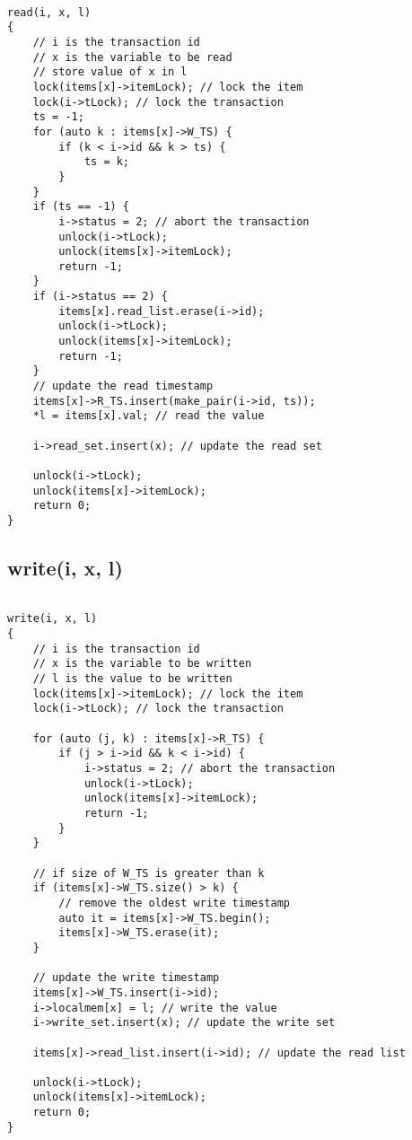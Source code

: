 \documentclass[12pt]{article}
\begin{document}
\begin{lstlisting}

read(i, x, l)
{
    // i is the transaction id
    // x is the variable to be read
    // store value of x in l
    lock(items[x]->itemLock); // lock the item
    lock(i->tLock); // lock the transaction
    ts = -1;
    for (auto k : items[x]->W_TS) {
        if (k < i->id && k > ts) {
            ts = k;
        }
    }
    if (ts == -1) {
        i->status = 2; // abort the transaction
        unlock(i->tLock);
        unlock(items[x]->itemLock);
        return -1;
    }
    if (i->status == 2) {
        items[x].read_list.erase(i->id);
        unlock(i->tLock);
        unlock(items[x]->itemLock);
        return -1;
    }
    // update the read timestamp
    items[x]->R_TS.insert(make_pair(i->id, ts));
    *l = items[x].val; // read the value
    
    i->read_set.insert(x); // update the read set

    unlock(i->tLock);
    unlock(items[x]->itemLock);
    return 0;
}

\end{lstlisting}

\subsection*{write(i, x, l)}

\begin{lstlisting}

write(i, x, l)
{
    // i is the transaction id
    // x is the variable to be written
    // l is the value to be written
    lock(items[x]->itemLock); // lock the item
    lock(i->tLock); // lock the transaction
    
    for (auto (j, k) : items[x]->R_TS) {
        if (j > i->id && k < i->id) {
            i->status = 2; // abort the transaction
            unlock(i->tLock);
            unlock(items[x]->itemLock);
            return -1;
        }
    }

    // if size of W_TS is greater than k
    if (items[x]->W_TS.size() > k) {
        // remove the oldest write timestamp
        auto it = items[x]->W_TS.begin();
        items[x]->W_TS.erase(it);
    }

    // update the write timestamp
    items[x]->W_TS.insert(i->id);
    i->localmem[x] = l; // write the value
    i->write_set.insert(x); // update the write set

    items[x]->read_list.insert(i->id); // update the read list
    
    unlock(i->tLock);
    unlock(items[x]->itemLock);
    return 0;
}

\end{lstlisting}
\end{document}
